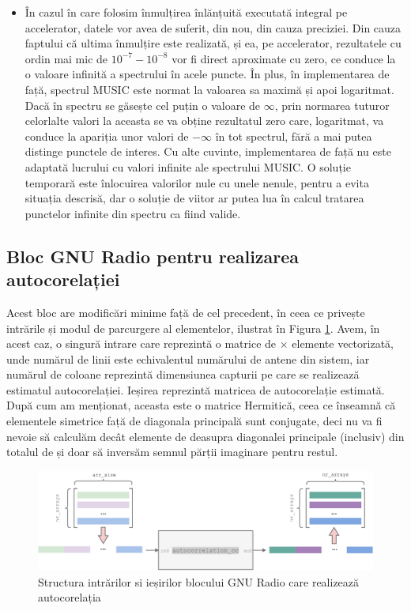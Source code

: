 \begin{itemize}
  \item În cazul în care folosim înmulțirea înlănțuită executată integral pe
  accelerator, datele vor avea de suferit, din nou, din cauza preciziei. Din
  cauza faptului că ultima înmulțire este realizată, și ea, pe accelerator,
  rezultatele cu ordin mai mic de $10^{-7} - 10^{-8}$ vor fi direct aproximate
  cu zero, ce conduce la o valoare infinită a spectrului în acele puncte. În
  plus, în implementarea de față, spectrul MUSIC este normat la valoarea sa
  maximă și apoi logaritmat. Dacă în spectru se găsește cel puțin o valoare de
  $\infty$, prin normarea tuturor celorlalte valori la aceasta se va obține
  rezultatul zero care, logaritmat, va conduce la apariția unor valori de
  $-\infty$ în tot spectrul, fără a mai putea distinge punctele de interes. Cu
  alte cuvinte, implementarea de față nu este adaptată lucrului cu valori
  infinite ale spectrului MUSIC. O soluție temporară este înlocuirea valorilor
  nule cu unele nenule, pentru a evita situația descrisă, dar o soluție de
  viitor ar putea lua în calcul tratarea punctelor infinite din spectru ca fiind
  valide.
\end{itemize}


\subsection{Bloc GNU Radio pentru realizarea autocorelației}
\label{ssec:gnuradio-kernel-autocorr}

Acest bloc are modificări minime față de cel precedent, în ceea ce privește
intrările și modul de parcurgere al elementelor, ilustrat în Figura
\ref{fig:autocorrelation-block}. Avem, în acest caz, o singură
intrare care reprezintă o matrice de  $\times$
 elemente vectorizată, unde numărul de linii este echivalentul
numărului de antene din sistem, iar numărul de coloane reprezintă dimensiunea
capturii pe care se realizează estimatul autocorelației. Ieșirea reprezintă
matricea de autocorelație estimată. După cum am menționat, aceasta este o
matrice Hermitică, ceea ce înseamnă că elementele simetrice față de diagonala
principală sunt conjugate, deci nu va fi nevoie să calculăm decât
 elemente de deasupra diagonalei principale
(inclusiv) din totalul de  și doar să inversăm
semnul părții imaginare pentru restul. \\

\begin{figure}[h]
    \centering
    \includegraphics[width=1\textwidth]{src/img/autocorrelation-block}
    \caption{Structura intrărilor si ieșirilor blocului GNU Radio care
    realizează autocorelația}
    \label{fig:autocorrelation-block}
\end{figure}

